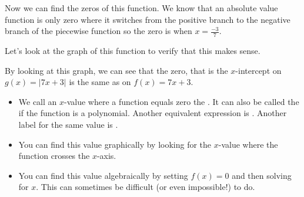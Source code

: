 \documentclass[nooutcomes]{ximera}
\begin{document}
\begin{example}
\begin{explanation}
Now we can find the zeros of this function.  We know that an absolute value function is only zero where it switches from the positive branch to the negative branch of the piecewise function so the zero is when $x=\tfrac{-3}{7}$.  

Let's look at the graph of this function to verify that this makes sense.

\begin{image}
\end{image}
\end{explanation}

By looking at this graph, we can see that the zero, that is the $x$-intercept on $g(x)=|7x+3|$ is the same as on $f(x)=7x+3$.
\end{example}


\begin{summary}\begin{itemize}
\item We call an $x$-value where a function equals zero the .  It can also be called the  if the function is a polynomial. Another equivalent expression is .  Another label for the same value is .
\item You can find this value graphically by looking for the $x$-value where the function crosses the $x$-axis.
\item You can find this value algebraically by setting $f(x)=0$ and then solving for $x$.  This can sometimes be difficult (or even impossible!) to do.  
\end{itemize}\end{summary}
\end{document}
